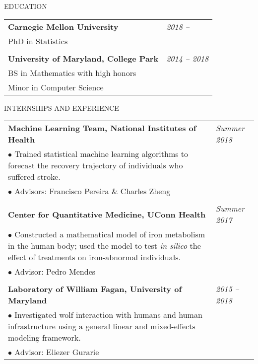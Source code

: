 \documentclass{resume} %
\begin{document}

\begin{rSection}{EDUCATION}

\begin{tabular}{p{14cm}R{2.5cm}}
	\bf{Carnegie Mellon University}  &  \it{2018 -- }  \\ 
	PhD in Statistics &  \\ & \\
	\textbf{University of Maryland, College Park} & \it{2014 -- 2018}
	 \\  BS in Mathematics with high honors & \\
	 Minor in Computer Science
\end{tabular} 
\end{rSection}




\begin{rSection}{INTERNSHIPS AND EXPERIENCE}

\begin{tabular}{p{14cm}R{2.5cm}}
	\textbf{Machine Learning Team, National Institutes of Health}  &  \it{Summer 2018} \\ 
	$\bullet$ Trained statistical machine learning algorithms to forecast the recovery trajectory of individuals who suffered stroke. & \\$\bullet$ Advisors: Francisco Pereira  \& Charles Zheng & \\ & \\
	\textbf{Center for Quantitative Medicine, UConn Health} & \textit{Summer 2017}\\
	$\bullet$ Constructed a mathematical model of iron metabolism in the human body; used the model to test \textit{in silico} the effect of treatments on iron-abnormal individuals.  & \\ $\bullet$ Advisor: Pedro Mendes & \\ & \\
	\textbf{Laboratory of William Fagan, University of Maryland} & \it{2015 -- 2018} \\ 
	$\bullet$ Investigated wolf interaction with humans and human infrastructure using a general linear and mixed-effects modeling framework.  &  \\ $\bullet$  Advisor: Eliezer Gurarie & \\ 
\end{tabular} 


\end{rSection}
\end{document}
